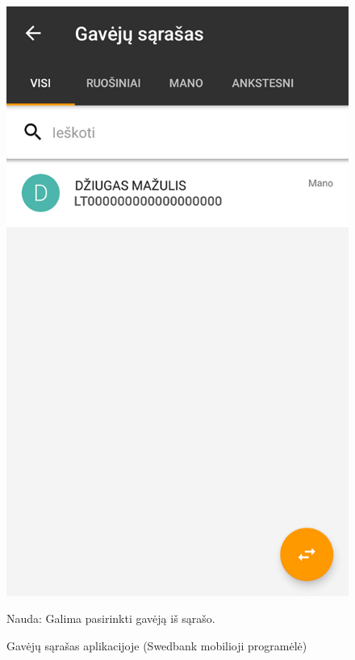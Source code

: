 \documentclass{VUMIFPSkursinis}
\begin{document}
\begin{figure}[!htb]
	\begin{center}
	\includegraphics[scale=0.4]{mobileAppRecipientList.png}
	\end{center}
  \caption{Gavėjų sąrašas aplikacijoje (Swedbank mobilioji programėlė)}
	\label{fig:mobileAppRecipientList}
	Nauda: Galima pasirinkti gavėją iš sąrašo.
\end{figure}
\end{document}
